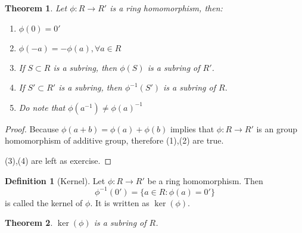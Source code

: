 \documentclass{article}
\theoremstyle{MyNonumberplain}
\theoremstyle{break}
\newtheorem*{proof}{Proof. }
\newcommand{\tmmathbf}[1]{\ensuremath{\boldsymbol{#1}}}
\theoremstyle{break}
\newtheorem{theorem}{Theorem}[section]
\theoremstyle{break}
\theoremstyle{definition}
\theoremstyle{break}
\newtheorem{definition}{Definition}[section]
\begin{document}
\begin{thmbox}
    \begin{theorem}
        Let $\phi : R \rightarrow R'$ is a ring homomorphism, then:\\
        \begin{enumerate}
          \item $\phi (0) = 0'$\\
          
          \item $\phi (- a) = - \phi (a), \forall a \in R$\\
          
          \item If $S \subset R$ is a subring, then $\phi (S)$ is a subring of $R'$.\bigskip
          
          \item If $S' \subset R'$ is a subring, then $\phi^{- 1} (S')$ is a subring
          of $R$.\bigskip
          
          \item Do note that $\phi (a^{- 1}) \tmmathbf{\neq} \phi (a)^{- 1}$
        \end{enumerate}
    \end{theorem}
    \begin{prfbox}
        \begin{proof}
            Because $\phi (a + b) = \phi (a) + \phi (b)$ implies that $\phi : R
            \rightarrow R'$ is an group homomorphism of additive group, therefore (1),(2)
            are true.\bigskip
            
            (3),(4) are left as exercise.
        \end{proof}
    \end{prfbox}
\end{thmbox}

\begin{defbox}
    \begin{definition}[Kernel]
        Let $\phi : R \rightarrow R'$ be a ring homomorphism. Then
        \[ \phi^{- 1} (0') = \{ a \in R : \phi (a) = 0' \} \]
        is called the kernel of $\phi$. It is written as $\ker (\phi)$.
    \end{definition}
\end{defbox}

\begin{thmbox}
    \begin{theorem}
        $\ker (\phi)$ is a subring of $R$. 
    \end{theorem}
\end{thmbox}
\end{document}
